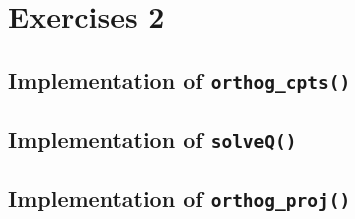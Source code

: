\section{Exercises 2}
\subsection{Implementation of \texttt{orthog\_cpts()}}


\subsection{Implementation of \texttt{solveQ()}}


\subsection{Implementation of \texttt{orthog\_proj()}}
